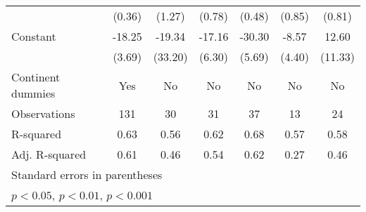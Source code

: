{\begin{tabular}{l*{6}{c}}
                    &      (0.36)         &      (1.27)         &      (0.78)         &      (0.48)         &      (0.85)         &      (0.81)         \\
\addlinespace
Constant            &      -18.25\sym{***}&      -19.34         &      -17.16\sym{*}  &      -30.30\sym{***}&       -8.57         &       12.60         \\
                    &      (3.69)         &     (33.20)         &      (6.30)         &      (5.69)         &      (4.40)         &     (11.33)         \\
\addlinespace
Continent dummies   &         Yes         &          No         &          No         &          No         &          No         &          No         \\
\midrule
Observations        &         131         &          30         &          31         &          37         &          13         &          24         \\
R-squared           &        0.63         &        0.56         &        0.62         &        0.68         &        0.57         &        0.58         \\
Adj. R-squared      &        0.61         &        0.46         &        0.54         &        0.62         &        0.27         &        0.46         \\
\bottomrule
\multicolumn{7}{l}{\footnotesize Standard errors in parentheses}\\
\multicolumn{7}{l}{\footnotesize \sym{*} \(p<0.05\), \sym{**} \(p<0.01\), \sym{***} \(p<0.001\)}\\
\end{tabular}
}
